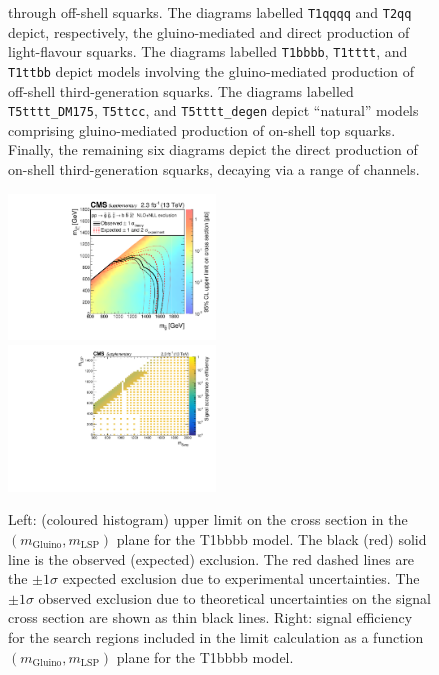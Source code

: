 \begin{figure}[tb]
\begin{center}
{     through off-shell squarks. The diagrams labelled
     \texttt{T1qqqq} and \texttt{T2qq} depict, respectively, the
     gluino-mediated and direct production of light-flavour
     squarks. The diagrams labelled \texttt{T1bbbb}, \texttt{T1tttt},
     and \texttt{T1ttbb} depict models involving the gluino-mediated
     production of off-shell third-generation squarks. The diagrams
     labelled \texttt{T5tttt\_DM175}, \texttt{T5ttcc}, and
     \texttt{T5tttt\_degen} depict ``natural'' models comprising
     gluino-mediated production of on-shell top squarks. Finally, the
     remaining six diagrams depict the direct production of on-shell
     third-generation squarks, decaying via a range of channels.  }
   \label{fig:simplified-models}
 \end{center}
\end{figure}


\clearpage
\begin{figure}[t]
  \begin{center}
    \includegraphics[width=0.49\textwidth]{supplementary/figures/RA1T1bbbbXSEC} \, 
    \includegraphics[width=0.49\textwidth]{supplementary/figures/T1bbbb_merging_4_cats} \,     
  \end{center}
  \caption{Left: (coloured histogram) upper limit on the cross section in the $(m_{\mathrm{Gluino}},m_{\mathrm{LSP}})$ plane for the T1bbbb model. 
  The black (red) solid line is the observed (expected) exclusion. The red dashed lines are the $\pm1\sigma$ expected exclusion due to experimental uncertainties. 
  The $\pm1\sigma$ observed exclusion due to theoretical uncertainties on the signal cross section are shown as thin black lines. 
  Right: signal efficiency for the search regions included in the limit calculation as a function $(m_{\mathrm{Gluino}},m_{\mathrm{LSP}})$ plane for the T1bbbb model. 
  \label{fig:T1bbbb_excl}}
\end{figure}


